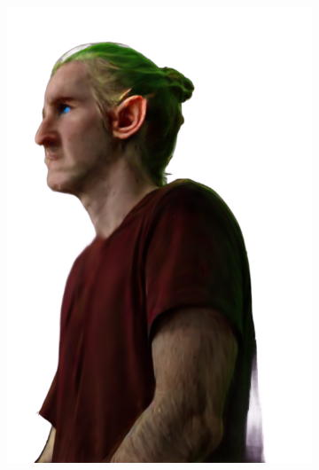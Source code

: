 \begin{figure}
    \centering
    \begin{subfigure}{0.18\linewidth}
        \includegraphics[width=\textwidth]{Figures/failed/igs2gs/27_render.png}

\end{subfigure}
\end{figure}
